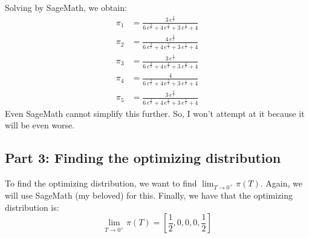 Solving by SageMath, we obtain:
\[
\begin{aligned}
    \pi_{1} &= \frac{3 \, e^{\frac{3}{T}}}{6 \, e^{\frac{3}{T}} + 4 \, e^{\frac{2}{T}} + 3 \, e^{\frac{1}{T}} + 4} \\
    \pi_{2} &= \frac{4 \, e^{\frac{2}{T}}}{6 \, e^{\frac{3}{T}} + 4 \, e^{\frac{2}{T}} + 3 \, e^{\frac{1}{T}} + 4} \\
    \pi_{3} &= \frac{3 \, e^{\frac{1}{T}}}{6 \, e^{\frac{3}{T}} + 4 \, e^{\frac{2}{T}} + 3 \, e^{\frac{1}{T}} + 4} \\
    \pi_{4} &= \frac{4}{6 \, e^{\frac{3}{T}} + 4 \, e^{\frac{2}{T}} + 3 \, e^{\frac{1}{T}} + 4} \\
    \pi_{5} &= \frac{3 \, e^{\frac{3}{T}}}{6 \, e^{\frac{3}{T}} + 4 \, e^{\frac{2}{T}} + 3 \, e^{\frac{1}{T}} + 4}
\end{aligned}
\]
Even SageMath cannot simplify this further. So, I won't attempt at it because it will be even worse.

\subsection*{Part 3: Finding the optimizing distribution}

To find the optimizing distribution, we want to find \(\lim_{T \to 0^+} \pi(T)\). Again, we will use SageMath (my beloved) for this. Finally, we have that the optimizing distribution is:
\[
    \lim_{T \to 0^+} \pi(T) = \left[\frac12, 0, 0, 0, \frac12\right]
\]
